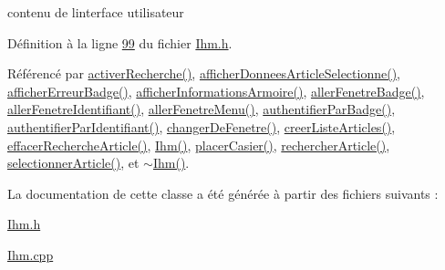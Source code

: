contenu de l\textquotesingle{}interface utilisateur 



Définition à la ligne \hyperlink{_ihm_8h_source_l00099}{99} du fichier \hyperlink{_ihm_8h_source}{Ihm.\+h}.



Référencé par \hyperlink{_ihm_8cpp_source_l00244}{activer\+Recherche()}, \hyperlink{_ihm_8cpp_source_l00305}{afficher\+Donnees\+Article\+Selectionne()}, \hyperlink{_ihm_8cpp_source_l00208}{afficher\+Erreur\+Badge()}, \hyperlink{_ihm_8cpp_source_l00106}{afficher\+Informations\+Armoire()}, \hyperlink{_ihm_8cpp_source_l00169}{aller\+Fenetre\+Badge()}, \hyperlink{_ihm_8cpp_source_l00180}{aller\+Fenetre\+Identifiant()}, \hyperlink{_ihm_8cpp_source_l00190}{aller\+Fenetre\+Menu()}, \hyperlink{_ihm_8cpp_source_l00119}{authentifier\+Par\+Badge()}, \hyperlink{_ihm_8cpp_source_l00139}{authentifier\+Par\+Identifiant()}, \hyperlink{_ihm_8cpp_source_l00077}{changer\+De\+Fenetre()}, \hyperlink{_ihm_8cpp_source_l00367}{creer\+Liste\+Articles()}, \hyperlink{_ihm_8cpp_source_l00266}{effacer\+Recherche\+Article()}, \hyperlink{_ihm_8cpp_source_l00029}{Ihm()}, \hyperlink{_ihm_8cpp_source_l00087}{placer\+Casier()}, \hyperlink{_ihm_8cpp_source_l00256}{rechercher\+Article()}, \hyperlink{_ihm_8cpp_source_l00291}{selectionner\+Article()}, et \hyperlink{_ihm_8cpp_source_l00067}{$\sim$\+Ihm()}.



La documentation de cette classe a été générée à partir des fichiers suivants \+:\begin{DoxyCompactItemize}
\item 
\hyperlink{_ihm_8h}{Ihm.\+h}\item 
\hyperlink{_ihm_8cpp}{Ihm.\+cpp}\end{DoxyCompactItemize}

